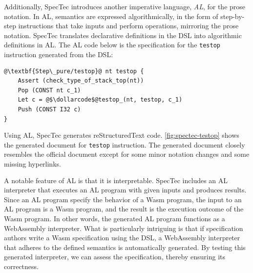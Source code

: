 Additionally, SpecTec introduces another imperative language, \textit{AL}, for
the prose notation.
In AL, semantics are expressed algorithmically, in the form of step-by-step
instructions that take inputs and perform operations, mirroring the prose notation.
SpecTec translates declarative definitions in the DSL into algorithmic
definitions in AL.
The AL code below is the specification for the \texttt{testop} instruction
generated from the DSL:
\begin{lstlisting}[style=al]
@\textbf{Step\_pure/testop}@ nt testop {
    Assert (check_type_of_stack_top(nt))
    Pop (CONST nt c_1)
    Let c = @$\dollarcode$@testop_(nt, testop, c_1)
    Push (CONST I32 c)
}
\end{lstlisting}
Using AL, SpecTec generates reStructuredText code.
\cref{fig:spectec-testop} shows the generated document for \texttt{testop}
instruction.
The generated document closely resembles the official document except for some
minor notation changes and some missing hyperlinks.


A notable feature of AL is that it is interpretable.
SpecTec includes an AL interpreter that executes an AL program with given inputs
and produces results.
Since an AL program specify the behavior of a Wasm program, the input to an AL
program is a Wasm program, and the result is the execution outcome of the Wasm
program.
In other words, the generated AL program functions as a WebAssembly interpreter.
What is particularly intriguing is that if specification authors write a Wasm
specification using the DSL, a WebAssembly interpreter that adheres to the
defined semantics is automatically generated.
By testing this generated interpreter, we can assess the specification,
thereby ensuring its correctness.
